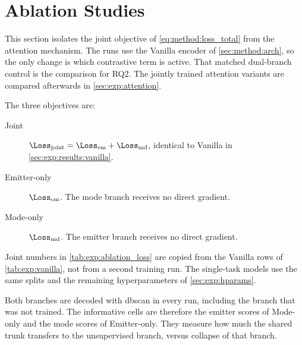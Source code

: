 \section{Ablation Studies}\label{sec:exp:ablation}

This section isolates the joint objective of \cref{eq:method:loss_total} from the attention mechanism.
The runs use the Vanilla encoder of \cref{sec:method:arch}, so the only change is which contrastive term is active.
That matched dual-branch control is the comparison for RQ2.
The jointly trained attention variants are compared afterwards in \cref{sec:exp:attention}.

The three objectives are:
\begin{description}
  \item[Joint] $\Loss_{\mathrm{joint}} = \Loss_{\mathrm{em}} + \Loss_{\mathrm{md}}$, identical to Vanilla in \cref{sec:exp:results:vanilla}.
  \item[Emitter-only] $\Loss_{\mathrm{em}}$. The mode branch receives no direct gradient.
  \item[Mode-only] $\Loss_{\mathrm{md}}$. The emitter branch receives no direct gradient.
\end{description}
Joint numbers in \cref{tab:exp:ablation_loss} are copied from the Vanilla rows of \cref{tab:exp:vanilla}, not from a second training run.
The single-task models use the same splits and the remaining hyperparameters of \cref{sec:exp:hparams}.

Both branches are decoded with \gls{dbscan} in every run, including the branch that was not trained.
The informative cells are therefore the emitter scores of Mode-only and the mode scores of Emitter-only.
They measure how much the shared trunk transfers to the unsupervised branch, versus collapse of that branch.

